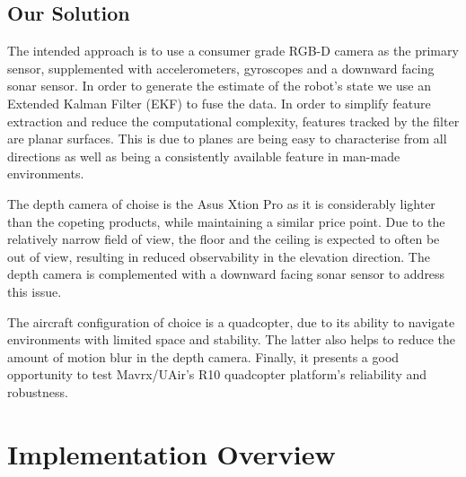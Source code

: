 \documentclass[]{article}
\begin{document}
{\subsection{Our Solution} %
\label{sub:our_solution}

The intended approach is to use a consumer grade RGB-D camera as the primary sensor, supplemented with accelerometers, gyroscopes and a downward facing sonar sensor. In order to generate the estimate of the robot's state we use an Extended Kalman Filter (EKF) to fuse the data. In order to simplify feature extraction and reduce the computational complexity, features tracked by the filter are planar surfaces. This is due to planes are being easy to characterise from all directions as well as being a consistently available feature in man-made environments. 

The depth camera of choise is the Asus Xtion Pro as it is considerably lighter than the copeting products, while maintaining a similar price point. Due to the relatively narrow field of view, the floor and the ceiling is expected to often be out of view, resulting in reduced observability in the elevation direction. The depth camera is complemented with a downward facing sonar sensor to address this issue.

The aircraft configuration of choice is a quadcopter, due to its ability to navigate environments with limited space and stability. The latter also helps to reduce the amount of motion blur in the depth camera. Finally, it presents a good opportunity to test Mavrx/UAir's R10 quadcopter platform's reliability and robustness.

\section{Implementation Overview}
\label{sub:implementation_overview}




}
\end{document}
